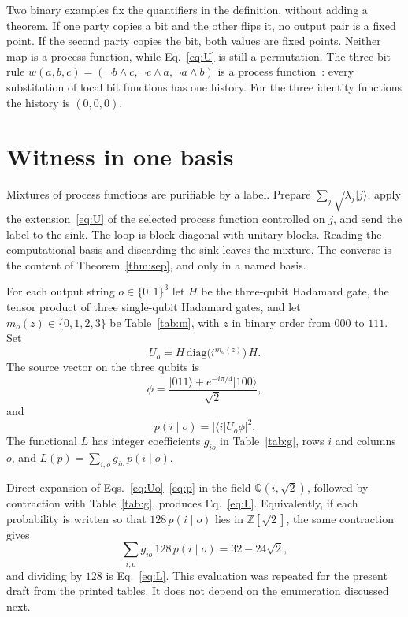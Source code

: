 \documentclass[aps,pra,reprint,amsmath,amssymb,nofootinbib]{revtex4-2}
\begin{document}
Two binary examples fix the quantifiers in the definition, without adding a theorem. If one party copies a bit and the other flips it, no output pair is a fixed point. If the second party copies the bit, both values are fixed points. Neither map is a process function, while Eq.~\eqref{eq:U} is still a permutation. The three-bit rule \(w(a,b,c)=(\lnot b\land c,\lnot c\land a,\lnot a\land b)\) is a process function~\cite{baumeler2016}: every substitution of local bit functions has one history. For the three identity functions the history is \((0,0,0)\).

\section{Witness in one basis}
\label{sec:witness}
Mixtures of process functions are purifiable by a label. Prepare \(\sum_j\sqrt{\lambda_j}\lvert j\rangle\), apply the extension~\eqref{eq:U} of the selected process function controlled on \(j\), and send the label to the sink. The loop is block diagonal with unitary blocks. Reading the computational basis and discarding the sink leaves the mixture. The converse is the content of Theorem~\ref{thm:sep}, and only in a named basis.

For each output string \(o\in\{0,1\}^3\) let \(H\) be the three-qubit Hadamard gate, the tensor product of three single-qubit Hadamard gates, and let \(m_o(z)\in\{0,1,2,3\}\) be Table~\ref{tab:m}, with \(z\) in binary order from \(000\) to \(111\). Set
\begin{equation}
\label{eq:Uo}
U_o=H\,\mathrm{diag}\bigl(i^{m_o(z)}\bigr)\,H.
\end{equation}
The source vector on the three qubits is
\begin{equation}
\label{eq:phi}
\phi=\frac{\lvert 011\rangle+e^{-i\pi/4}\lvert 100\rangle}{\sqrt{2}},
\end{equation}
and
\begin{equation}
\label{eq:p}
p(i\mid o)=\lvert\langle i\rvert U_o\phi\rvert^2.
\end{equation}
The functional \(L\) has integer coefficients \(g_{io}\) in Table~\ref{tab:g}, rows \(i\) and columns \(o\), and \(L(p)=\sum_{i,o}g_{io}\,p(i\mid o)\).

Direct expansion of Eqs.~\eqref{eq:Uo}--\eqref{eq:p} in the field \(\mathbb{Q}(i,\sqrt{2})\), followed by contraction with Table~\ref{tab:g}, produces Eq.~\eqref{eq:L}. Equivalently, if each probability is written so that \(128\,p(i\mid o)\) lies in \(\mathbb{Z}[\sqrt{2}]\), the same contraction gives
\begin{equation}
\sum_{i,o}g_{io}\,128\,p(i\mid o)=32-24\sqrt{2},
\end{equation}
and dividing by \(128\) is Eq.~\eqref{eq:L}. This evaluation was repeated for the present draft from the printed tables. It does not depend on the enumeration discussed next.
\end{document}
